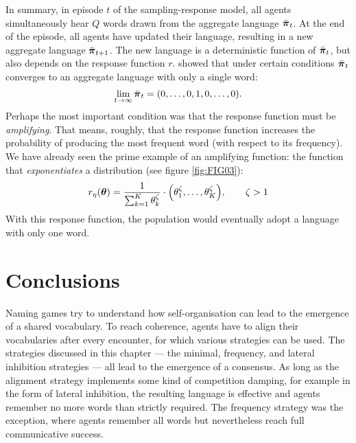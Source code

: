 \documentclass{../src/bcthesispart}
\begin{document}
In summary, in episode $t$ of the sampling-response model, all agents simultaneously hear $Q$ words drawn from the aggregate language $\bar{\boldsymbol{\mathbf{\pi}}}_t$.
At the end of the episode, all agents have updated their language, resulting in a new aggregate language $\bar{\boldsymbol{\mathbf{\pi}}}_{t+1}$.
The new language is a deterministic function of $\bar{\boldsymbol{\mathbf{\pi}}}_t$, but also depends on the response function $r$.
\textcite{DeVylder2006} showed that under certain conditions $\bar{\boldsymbol{\mathbf{\pi}}}_t$ converges to an aggregate language with only a single word:
\begin{equation}
	\lim_{t\to \infty} \bar{\boldsymbol{\mathbf{\pi}}}_t 
		= (0,\dots,0,1,0,\dots, 0).
\end{equation}
Perhaps the most important condition was that the response function must be \emph{amplifying}.
That means, roughly, that the response function increases the probability of producing the most frequent word (with respect to its frequency).
We have already seen the prime example of an amplifying function: the function that \emph{exponentiates} a distribution (see figure \ref{fig:FIG03}):
\begin{align}
	r_\eta(\boldsymbol{\mathbf{\theta}}) 
		= \frac{1}{\sum_{k=1}^K \theta_k^\zeta} 
			\cdot \Bigl(\theta_1^\zeta, \dots, \theta_K^\zeta \Bigr),
	\qquad \zeta > 1
\end{align}
With this response function, the population would eventually adopt a language with only one word.





\section{Conclusions}


Naming games try to understand how self-organisation can lead to the emergence of a shared vocabulary.
To reach coherence, agents have to align their vocabularies after every encounter, for which various strategies can be used.
The strategies discussed in this chapter — the minimal, frequency, and lateral inhibition strategies — all lead to the emergence of a consensus.
As long as the alignment strategy implements some kind of competition damping, for example in the form of lateral inhibition, the resulting language is effective and agents remember no more words than strictly required.
The frequency strategy was the exception, where agents remember all words but nevertheless reach full communicative success.
\end{document}
